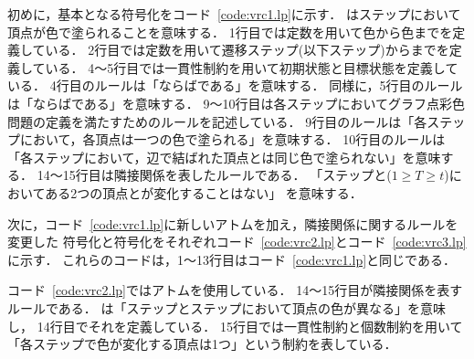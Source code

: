 初めに，基本となる符号化をコード~\ref{code:vrc1.lp}に示す．
はステップにおいて頂点が色で塗られることを意味する．
1行目では定数を用いて色から色までを定義している．
2行目では定数を用いて遷移ステップ(以下ステップ)からまでを定義している．
4～5行目では一貫性制約を用いて初期状態と目標状態を定義している．
4行目のルールは「ならばである」を意味する．
同様に，5行目のルールは「ならばである」を意味する．
9～10行目は各ステップにおいてグラフ点彩色問題の定義を満たすためのルールを記述している．
9行目のルールは「各ステップにおいて，各頂点は一つの色で塗られる」を意味する．
10行目のルールは「各ステップにおいて，辺で結ばれた頂点とは同じ色で塗られない」を意味する．
14～15行目は隣接関係を表したルールである．
「ステップと($1 \geq T \geq t$)においてある2つの頂点とが変化することはない」
を意味する．



次に，コード~\ref{code:vrc1.lp}に新しいアトムを加え，隣接関係に関するルールを変更した
符号化と符号化をそれぞれコード~\ref{code:vrc2.lp}とコード~\ref{code:vrc3.lp}に示す．
これらのコードは，1～13行目はコード~\ref{code:vrc1.lp}と同じである．





コード~\ref{code:vrc2.lp}ではアトムを使用している．
14～15行目が隣接関係を表すルールである．
は「ステップとステップにおいて頂点の色が異なる」を意味し，
14行目でそれを定義している．
15行目では一貫性制約と個数制約を用いて「各ステップで色が変化する頂点は1つ」という制約を表している．

